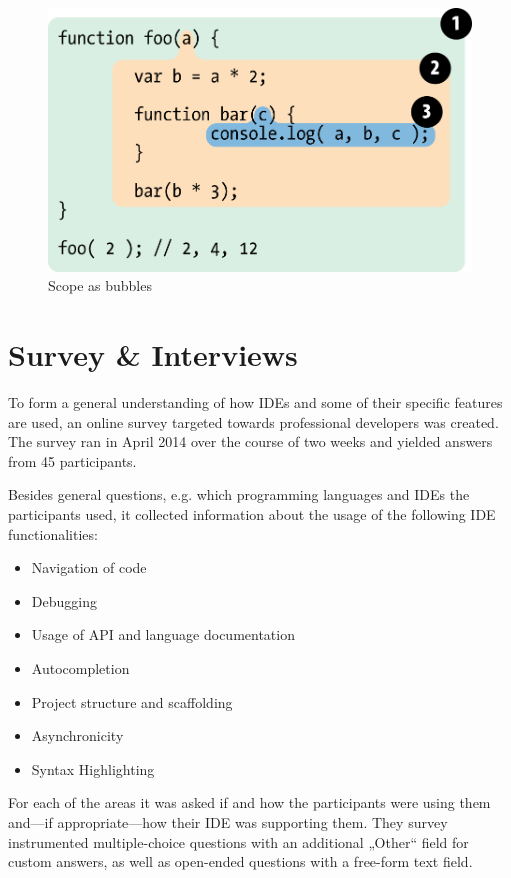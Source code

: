 \begin{figure}[htbp]
\centering
\includegraphics{fig2.png}
\caption{Scope as bubbles \cite{getify}}
\end{figure}

\section{Survey \& Interviews}\label{survey-interviews}

To form a general understanding of how IDEs and some of their specific
features are used, an online survey targeted towards professional
developers was created. The survey ran in April 2014 over the course of
two weeks and yielded answers from 45 participants.

Besides general questions, e.g. which programming languages and IDEs the
participants used, it collected information about the usage of the
following IDE functionalities:

\begin{itemize}
\itemsep1pt\parskip0pt
\item
  Navigation of code
\item
  Debugging
\item
  Usage of API and language documentation
\item
  Autocompletion
\item
  Project structure and scaffolding
\item
  Asynchronicity
\item
  Syntax Highlighting
\end{itemize}

For each of the areas it was asked if and how the participants were
using them and—if appropriate—how their IDE was supporting them. They
survey instrumented multiple-choice questions with an additional „Other“
field for custom answers, as well as open-ended questions with a
free-form text field.
